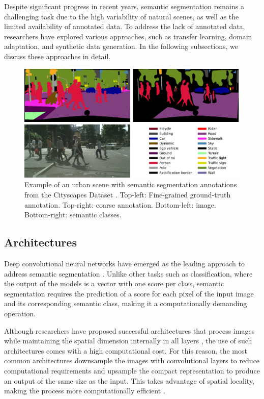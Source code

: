 Despite significant progress in recent years, semantic segmentation remains a challenging task due to the high variability of natural scenes, as well as the limited availability of annotated data. To address the lack of annotated data, researchers have explored various approaches, such as transfer learning, domain adaptation, and synthetic data generation. In the following subsections, we discuss these approaches in detail.


\begin{figure}
    \centering
    \includegraphics[width=1\columnwidth]{img/2-related-work/1-example-annotation.pdf}
    \caption[Example of semantic segmentation annotations]{Example of an urban scene with semantic segmentation annotations from the Cityscapes Dataset \cite{Cityscapes}. Top-left: Fine-grained ground-truth annotation. Top-right: coarse annotation. Bottom-left: image. Bottom-right: semantic classes.}
    \label{fig:semantic-segmentation-example}
\end{figure}
    



\subsection{Architectures}


Deep convolutional neural networks have emerged as the leading approach to address semantic segmentation \cite{Chai2021}. Unlike other tasks such as classification, where the output of the models is a vector with one score per class, semantic segmentation requires the prediction of a score for each pixel of the input image and its corresponding semantic class, making it a computationally demanding operation. 

Although researchers have proposed successful architectures that process images while maintaining the spatial dimension internally in all layers \cite{Sun2019HighResolutionRF}, the use of such architectures comes with a high computational cost.
For this reason, the most common architectures downsample the images with convolutional layers to reduce computational requirements and upsample the compact representation to produce an output of the same size as the input. This takes advantage of spatial locality, making the process more computationally efficient \cite{SemanticSegmentationSurvey}.


